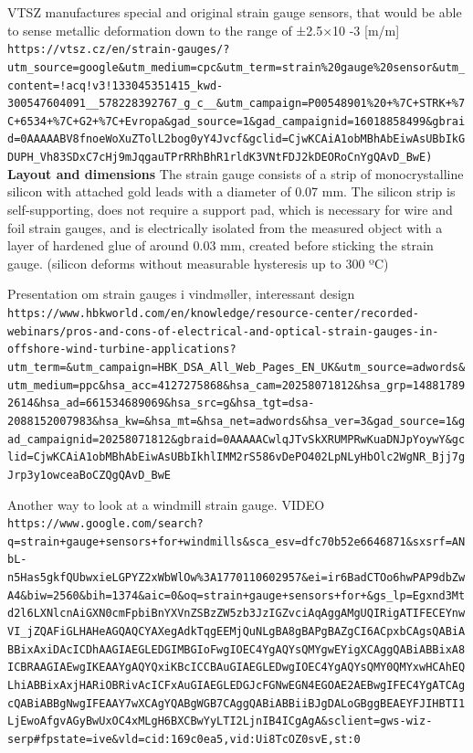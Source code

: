 VTSZ manufactures special and original strain gauge sensors, that would be able to sense metallic deformation down to the range of ±2.5×10 -3 [m/m] 
\verb|https://vtsz.cz/en/strain-gauges/?utm_source=google&utm_medium=cpc&utm_term=strain%20gauge%20sensor&utm_content=!acq!v3!133045351415_kwd-300547604091__578228392767_g_c__&utm_campaign=P00548901%20+%7C+STRK+%7C+6534+%7C+G2+%7C+Evropa&gad_source=1&gad_campaignid=16018858499&gbraid=0AAAAABV8fnoeWoXuZTolL2bog0yY4Jvcf&gclid=CjwKCAiA1obMBhAbEiwAsUBbIkGDUPH_Vh83SDxC7cHj9mJqgauTPrRRhBhR1rldK3VNtFDJ2kDEORoCnYgQAvD_BwE)|
\textbf{Layout and dimensions}
The strain gauge consists of a strip of monocrystalline silicon with attached gold leads with a diameter of 0.07 mm. The silicon strip is self-supporting, does not require a support pad, which is necessary for wire and foil strain gauges, and is electrically isolated from the measured object with a layer of hardened glue of around 0.03 mm, created before sticking the strain gauge. (silicon deforms without measurable hysteresis up to 300 ºC)

Presentation om strain gauges i vindmøller, interessant design
\verb|https://www.hbkworld.com/en/knowledge/resource-center/recorded-webinars/pros-and-cons-of-electrical-and-optical-strain-gauges-in-offshore-wind-turbine-applications?utm_term=&utm_campaign=HBK_DSA_All_Web_Pages_EN_UK&utm_source=adwords&utm_medium=ppc&hsa_acc=4127275868&hsa_cam=20258071812&hsa_grp=148817892614&hsa_ad=661534689069&hsa_src=g&hsa_tgt=dsa-2088152007983&hsa_kw=&hsa_mt=&hsa_net=adwords&hsa_ver=3&gad_source=1&gad_campaignid=20258071812&gbraid=0AAAAACwlqJTvSkXRUMPRwKuaDNJpYoywY&gclid=CjwKCAiA1obMBhAbEiwAsUBbIkhlIMM2rS586vDePO402LpNLyHbOlc2WgNR_Bjj7gJrp3y1owceaBoCZQgQAvD_BwE|

Another way to look at a windmill strain gauge. VIDEO
\verb|https://www.google.com/search?q=strain+gauge+sensors+for+windmills&sca_esv=dfc70b52e6646871&sxsrf=ANbL-n5Has5gkfQUbwxieLGPYZ2xWbWlOw%3A1770110602957&ei=ir6BadCTOo6hwPAP9dbZwA4&biw=2560&bih=1374&aic=0&oq=strain+gauge+sensors+for+&gs_lp=Egxnd3Mtd2l6LXNlcnAiGXN0cmFpbiBnYXVnZSBzZW5zb3JzIGZvciAqAggAMgUQIRigATIFECEYnwVI_jZQAFiGLHAHeAGQAQCYAXegAdkTqgEEMjQuNLgBA8gBAPgBAZgCI6ACpxbCAgsQABiABBixAxiDAcICDhAAGIAEGLEDGIMBGIoFwgIOEC4YgAQYsQMYgwEYigXCAggQABiABBixA8ICBRAAGIAEwgIKEAAYgAQYQxiKBcICCBAuGIAEGLEDwgIOEC4YgAQYsQMY0QMYxwHCAhEQLhiABBixAxjHARiOBRivAcICFxAuGIAEGLEDGJcFGNwEGN4EGOAE2AEBwgIFEC4YgATCAgcQABiABBgNwgIFEAAY7wXCAgYQABgWGB7CAggQABiABBiiBJgDALoGBggBEAEYFJIHBTI1LjEwoAfgvAGyBwUxOC4xMLgH6BXCBwYyLTI2LjnIB4ICgAgA&sclient=gws-wiz-serp#fpstate=ive&vld=cid:169c0ea5,vid:Ui8TcOZ0svE,st:0|

